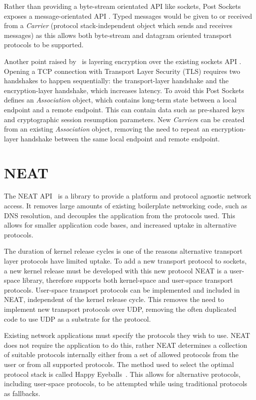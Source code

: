 Rather than providing a byte-stream orientated API like sockets, Post Sockets exposes a message-orientated API .
Typed messages would be given to or received from a \emph{Carrier} (protocol stack-independent object which sends and
receives messages) as this allows both byte-stream and datagram oriented transport protocols to be supported.

Another point raised by~\cite{kuhlewind_postsocketsabstract_} is layering encryption over the existing sockets API .
Opening a TCP connection with Transport Layer Security (TLS) requires two handshakes to happen sequentially: the
transport-layer handshake and the encryption-layer handshake, which increases latency.
To avoid this Post Sockets defines an \emph{Association} object, which contains long-term state between a local endpoint
and a remote endpoint.
This can contain data such as pre-shared keys and cryptographic session resumption parameters.
New \emph{Carrier}s can be created from an existing \emph{Association} object, removing the need to repeat an
encryption-layer handshake between the same local endpoint and remote endpoint.

\section{NEAT}\label{sec:neat}
The NEAT API~\citep{khademi_neatplatformprotocolindependent_2017} is a library to provide a platform and protocol
agnostic network access.
It removes large amounts of existing boilerplate networking code, such as DNS resolution, and decouples the application
from the protocols used.
This allows for smaller application code bases, and increased uptake in alternative protocols.

The duration of kernel release cycles is one of the reasons alternative transport layer protocols have limited uptake.
To add a new transport protocol to sockets, a new kernel release must be developed with this new protocol
NEAT is a user-space library, therefore supports both kernel-space and user-space transport protocols.
User-space transport protocols can be implemented and included in NEAT, independent of the kernel release cycle.
This removes the need to implement new transport protocols over UDP, removing the often duplicated code to use UDP
as a substrate for the protocol.

Existing network applications must specify the protocols they wish to use.
NEAT does not require the application to do this, rather NEAT determines a collection of suitable protocols internally
either from a set of allowed protocols from the user or from all supported protocols.
The method used to select the optimal protocol stack is called Happy Eyeballs~\citep{pauly_happyeyeballsversion_}.
This allows for alternative protocols, including user-space protocols, to be attempted while using traditional protocols
as fallbacks.

